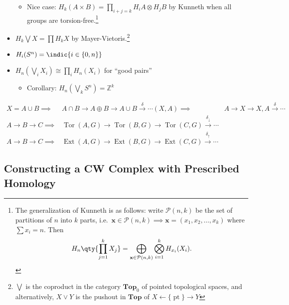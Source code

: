 \begin{itemize}
  \begin{itemize}
  \tightlist
  \item
    Nice case: \(H_k (A\times B) = \prod_{i+j=k} H_i A \otimes H_j B\)
    by Kunneth when all groups are torsion-free.\footnote{The
      generalization of Kunneth is as follows: write
      \(\mathcal{P}(n, k)\) be the set of partitions of \(n\) into \(k\)
      parts,
      i.e.~\(\mathbf{x} \in \mathcal{P}(n,k) \implies \mathbf{x} = (x_1, x_2, \ldots, x_k)\)
      where \(\sum x_i = n\). Then
      \begin{align*}
      H_n\qty{\prod_{j=1}^k X_j} = \bigoplus_{\mathbf{x} \in \mathcal{P}(n,k)} \bigotimes_{i=1}^{k} H_{x_i}(X_i).
      \end{align*}
    }
  \end{itemize}
\item
  \(H_k \bigvee X = \prod H_k X\) by Mayer-Vietoris.\footnote{\(\bigvee\)
    is the coproduct in the category \(\mathbf{Top}_0\) of pointed
    topological spaces, and alternatively, \(X\vee Y\) is the pushout in
    \(\mathbf{Top}\) of \(X \leftarrow{\{\operatorname{pt}\}}\to Y\)}
\item
  \(H_i(S^n) = \indic{i \in \left\{{0, n}\right\}}\)
\item
  \(H_n(\bigvee_i X_i) \cong \prod_i H_n(X_i)\) for ``good pairs''

  \begin{itemize}
  \tightlist
  \item
    Corollary: \(H_n(\bigvee_k S^n) = {\mathbb{Z}}^k\)
  \end{itemize}
\end{itemize}

\begin{align*} X = A\cup B \implies &A\cap B \to A \oplus B \to A \cup B \xrightarrow{\delta} \cdots (X,A) \implies &A \to X \to X,A \xrightarrow{\delta} \cdots\\ A\to B \to C \implies & \operatorname{Tor}(A, G) \to \operatorname{Tor}(B, G) \to \operatorname{Tor}(C, G) \xrightarrow{\delta_\downarrow} \cdots \\ A\to B \to C \implies & \operatorname{Ext}(A, G) \to \operatorname{Ext}(B, G) \to \operatorname{Ext}(C, G) \xrightarrow{\delta_\uparrow} \cdots \end{align*}

\hypertarget{constructing-a-cw-complex-with-prescribed-homology}{%
\subsection{Constructing a CW Complex with Prescribed
Homology}\label{constructing-a-cw-complex-with-prescribed-homology}}

